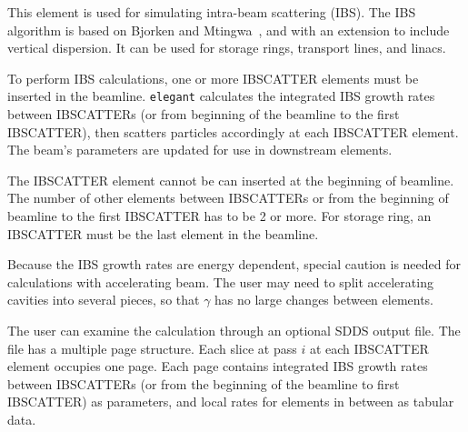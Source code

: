 This element is used for simulating intra-beam scattering (IBS).  The IBS algorithm is based on Bjorken and
Mtingwa~\cite{BM}, and with an extension to include vertical dispersion. It can be used for storage
rings, transport lines, and linacs.

To perform IBS calculations, one or more IBSCATTER elements must be inserted in the beamline. {\tt elegant} calculates
the integrated IBS growth rates between IBSCATTERs (or from beginning of the beamline to the first IBSCATTER), then
scatters particles accordingly at each IBSCATTER element. The beam's parameters are updated for use in downstream
elements.

The IBSCATTER element cannot be can inserted at the beginning of beamline. The number of other elements between
IBSCATTERs or from the beginning of beamline to the first IBSCATTER has to be 2 or more. For storage ring, an IBSCATTER
must be the last element in the beamline.

Because the IBS growth rates are energy dependent, special caution is needed for calculations with accelerating
beam. The user may need to split accelerating cavities into several pieces, so that $\gamma$ has no large changes
between elements.

The user can examine the calculation through an optional SDDS output file.  The file has a multiple page structure. Each
slice at pass $i$ at each IBSCATTER element occupies one page. Each page contains integrated IBS growth rates between
IBSCATTERs (or from the beginning of the beamline to first IBSCATTER) as parameters, and local rates for elements in between
as tabular data.
